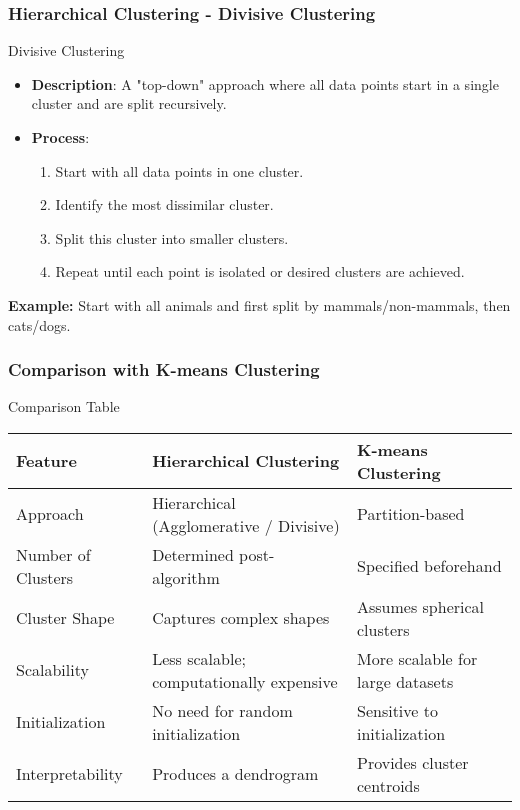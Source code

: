\documentclass[aspectratio=169]{beamer}
\begin{document}
\begin{frame}[fragile]
    \frametitle{Hierarchical Clustering - Divisive Clustering}
    \begin{block}{Divisive Clustering}
        \begin{itemize}
            \item \textbf{Description}: A "top-down" approach where all data points start in a single cluster and are split recursively.
            \item \textbf{Process}:
            \begin{enumerate}
                \item Start with all data points in one cluster.
                \item Identify the most dissimilar cluster.
                \item Split this cluster into smaller clusters.
                \item Repeat until each point is isolated or desired clusters are achieved.
            \end{enumerate}
        \end{itemize}
    \end{block}
    \begin{example}
        \textbf{Example:} Start with all animals and first split by mammals/non-mammals, then cats/dogs.
    \end{example}
\end{frame}

\begin{frame}[fragile]
    \frametitle{Comparison with K-means Clustering}
    \begin{block}{Comparison Table}
        \begin{tabular}{|l|l|l|}
            \hline
            \textbf{Feature} & \textbf{Hierarchical Clustering} & \textbf{K-means Clustering} \\
            \hline
            Approach & Hierarchical (Agglomerative / Divisive) & Partition-based \\
            Number of Clusters & Determined post-algorithm & Specified beforehand \\
            Cluster Shape & Captures complex shapes & Assumes spherical clusters \\
            Scalability & Less scalable; computationally expensive & More scalable for large datasets \\
            Initialization & No need for random initialization & Sensitive to initialization \\
            Interpretability & Produces a dendrogram & Provides cluster centroids \\
            \hline
        \end{tabular}
    \end{block}
\end{frame}
\end{document}
